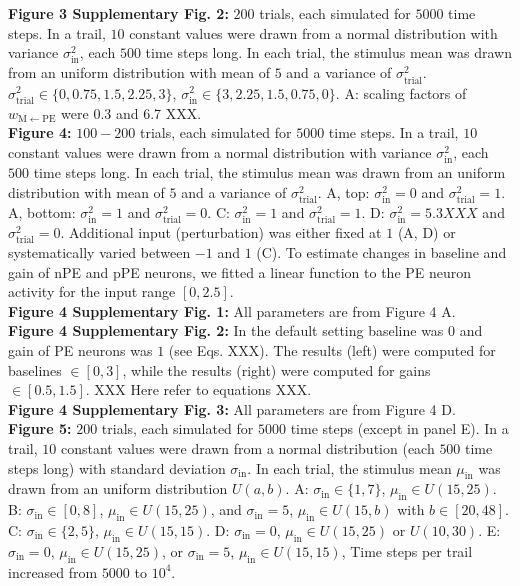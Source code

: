 \documentclass[10pt,a4paper,draft]{article}
\begin{document}
%
\textbf{Figure 3 Supplementary Fig. 2:} $200$ trials, each simulated for $5000$ time steps. In a trail, $10$ constant values were drawn from a normal distribution with variance $\sigma^2_\mathrm{in}$, each $500$ time steps long. In each trial, the stimulus mean was drawn from an uniform distribution with mean of $5$ and a variance of $\sigma^2_\mathrm{trial}$. $\sigma^2_\mathrm{trial} \in \lbrace0, 0.75, 1.5, 2.25, 3\rbrace$, $\sigma^2_\mathrm{in} \in \lbrace 3, 2.25, 1.5,0.75, 0\rbrace$. A: scaling factors of $w_\mathrm{M\leftarrow PE}$ were 0.3 and 6.7 XXX.\\
%
\textbf{Figure 4:} $100-200$ trials, each simulated for $5000$ time steps. In a trail, $10$ constant values were drawn from a normal distribution with variance $\sigma^2_\mathrm{in}$, each $500$ time steps long. In each trial, the stimulus mean was drawn from an uniform distribution with mean of $5$ and a variance of $\sigma^2_\mathrm{trial}$. A, top: $\sigma^2_\mathrm{in} = 0$ and $\sigma^2_\mathrm{trial} = 1$. A, bottom: $\sigma^2_\mathrm{in} = 1$ and $\sigma^2_\mathrm{trial} = 0$. C: $\sigma^2_\mathrm{in} = 1$ and $\sigma^2_\mathrm{trial} = 1$. D: $\sigma^2_\mathrm{in} = 5.3 XXX$ and $\sigma^2_\mathrm{trial} = 0$. Additional input (perturbation) was either fixed at $1$ (A, D) or systematically varied between $-1$ and $1$ (C). To estimate changes in baseline and gain of nPE and pPE neurons, we fitted a linear function to the PE neuron activity for the input range $[0, 2.5]$.\\
%
\textbf{Figure 4 Supplementary Fig. 1:} All parameters are from Figure 4 A.\\
%
\textbf{Figure 4 Supplementary Fig. 2:} In the default setting baseline was $0$ and gain of PE neurons was $1$ (see Eqs. XXX). The results (left) were computed for baselines $\in [0, 3]$, while the results (right) were computed for gains $\in [0.5, 1.5]$. XXX Here refer to equations XXX. \\
%
\textbf{Figure 4 Supplementary Fig. 3:} All parameters are from Figure 4 D.\\
%
\textbf{Figure 5:} $200$ trials, each simulated for $5000$ time steps (except in panel E). In a trail, $10$ constant values were drawn from a normal distribution (each $500$ time steps long) with standard deviation $\sigma_\mathrm{in}$. In each trial, the stimulus mean $\mu_\mathrm{in}$ was drawn from an uniform distribution $U(a, b)$. A: $\sigma_\mathrm{in} \in \lbrace1,7\rbrace$, $\mu_\mathrm{in} \in U(15, 25)$. B: $\sigma_\mathrm{in} \in [0,8]$, $\mu_\mathrm{in} \in U(15, 25)$, and $\sigma_\mathrm{in} = 5$, $\mu_\mathrm{in} \in U(15, b)$ with $b\in [20, 48]$. C: $\sigma_\mathrm{in} \in \lbrace2,5\rbrace$, $\mu_\mathrm{in} \in U(15, 15)$. D: $\sigma_\mathrm{in} = 0$, $\mu_\mathrm{in} \in U(15, 25)$ or $U(10, 30)$. E: $\sigma_\mathrm{in} = 0$, $\mu_\mathrm{in} \in U(15, 25)$, or $\sigma_\mathrm{in} = 5$, $\mu_\mathrm{in} \in U(15, 15)$,  Time steps per trail increased from $5000$ to $10^4$.\\
\end{document}
